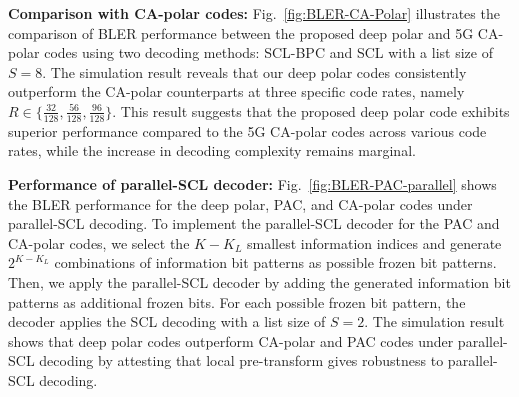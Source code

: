 \documentclass[conference]{IEEEtran}
\begin{document}






 \vspace{0.2cm}


{\bf Comparison with CA-polar codes:}
Fig.~\ref{fig:BLER-CA-Polar} illustrates the comparison of BLER performance between the proposed deep polar and 5G CA-polar codes using two decoding methods: SCL-BPC and SCL with a list size of $S=8$. The simulation result reveals that our deep polar codes consistently outperform the CA-polar counterparts at three specific code rates, namely $R\in \{\frac{32}{128}, \frac{56}{128}, \frac{96}{128}\}$. This result suggests that the proposed deep polar code exhibits superior performance compared to the 5G CA-polar codes across various code rates, while the increase in decoding complexity remains marginal.

 \vspace{0.2cm}
{\bf Performance of parallel-SCL decoder:}
 Fig.~\ref{fig:BLER-PAC-parallel} shows the BLER performance for the deep polar, PAC, and CA-polar codes under parallel-SCL decoding. To implement the parallel-SCL decoder for the PAC and CA-polar codes, we select the $K-K_L$ smallest information indices and generate $2^{K-K_L}$ combinations of information bit patterns as possible frozen bit patterns. Then, we apply the parallel-SCL decoder by adding the generated information bit patterns as additional frozen bits. For each possible frozen bit pattern, the decoder applies the SCL decoding with a list size of $S=2$. The simulation result shows that deep polar codes outperform CA-polar and PAC codes under parallel-SCL decoding by attesting that local pre-transform gives robustness to parallel-SCL decoding.
\end{document}
